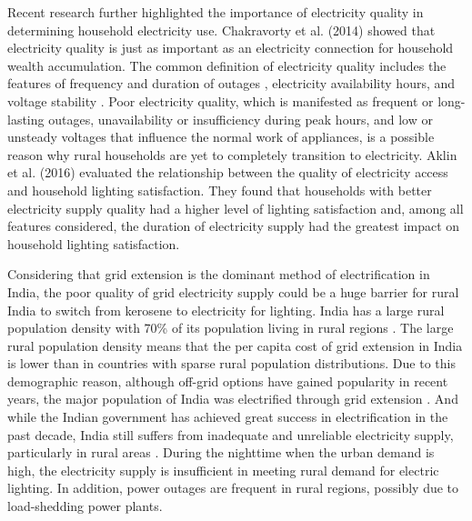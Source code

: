 \documentclass[11pt,english]{article}
\theoremstyle{plain} \newtheorem{claim}{Claim}
\theoremstyle{plain} \newtheorem{prop}{Proposition}
\theoremstyle{plain} \newtheorem{hypo}{Hypothesis}
\begin{document}
Recent research further highlighted the importance of electricity quality in determining household electricity use. Chakravorty et al. (2014) \citep{Chakravortyetal2014} showed that electricity quality is just as important as an electricity connection for household wealth accumulation. The common definition of electricity quality includes the features of frequency and duration of outages \citep{Allcottetal2016}, electricity availability hours, and voltage stability \citep{Mcrae2015}. Poor electricity quality, which is manifested as frequent or long-lasting outages, unavailability or insufficiency during peak hours, and low or unsteady voltages that influence the normal work of appliances, is a possible reason why rural households are yet to completely transition to electricity. Aklin et al. (2016) \citep{Aklinetal2016} evaluated the relationship between the quality of electricity access and household lighting satisfaction. They found that households with better electricity supply quality had a higher level of lighting satisfaction and, among all features considered, the duration of electricity supply had the greatest impact on household lighting satisfaction.

Considering that grid extension is the dominant method of electrification in India, the poor quality of grid electricity supply could be a huge barrier for rural India to switch from kerosene to electricity for lighting. India has a large rural population density with 70\% of its population living in rural regions \citep{SinhaKandpal1991}. The large rural population density means that the per capita cost of grid extension in India is lower than in countries with sparse rural population distributions. Due to this demographic reason, although off-grid options have gained popularity in recent years, the major population of India was electrified through grid extension \citep{Urpelainen2014}. And while the Indian government has achieved great success in electrification in the past decade, India still suffers from inadequate and unreliable electricity supply, particularly in rural areas \citep{Barnes2007, Bernard2012, Urpelainen2014}. During the nighttime when the urban demand is high, the electricity supply is insufficient in meeting rural demand for electric lighting. In addition, power outages are frequent in rural regions, possibly due to load-shedding power plants.
\end{document}
